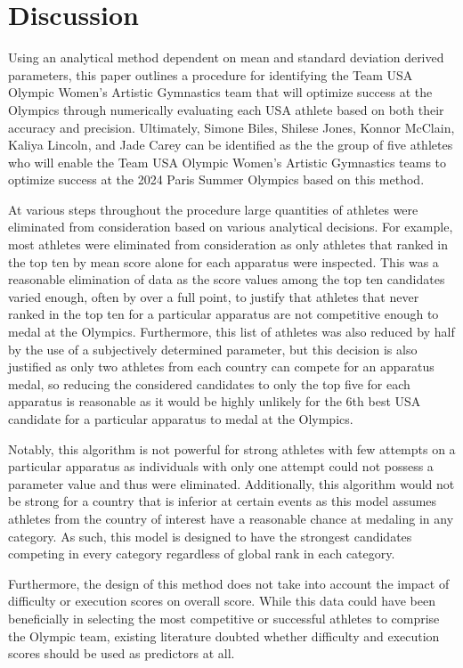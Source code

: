 \documentclass[12pt]{article}
\begin{document}
\section{Discussion}
\label{sec:dis}

Using an analytical method dependent on mean and standard deviation derived parameters, this paper 
outlines a procedure for identifying the Team USA Olympic Women’s Artistic Gymnastics team that will optimize 
success at the Olympics through numerically evaluating each USA athlete based on both their accuracy and precision. 
Ultimately, Simone Biles, Shilese Jones, Konnor McClain, Kaliya Lincoln, and Jade Carey can be identified as the 
the group of five athletes who will enable the Team USA Olympic Women’s Artistic Gymnastics teams to optimize 
success at the 2024 Paris Summer Olympics based on this method.

At various steps throughout the procedure large quantities of athletes were eliminated from consideration 
based on various analytical decisions. For example, most athletes were eliminated from consideration as 
only athletes that ranked in the top ten by mean score alone for each apparatus were inspected. This was a 
reasonable elimination of data as the score values among the top ten candidates varied enough, often by over a 
full point, to justify that athletes that never ranked in the top ten for a particular apparatus are not 
competitive enough to medal at the Olympics. Furthermore, this list of athletes was also reduced by half by the 
use of a subjectively determined parameter, but this decision is also justified as only two athletes from each 
country can compete for an apparatus medal, so reducing the considered candidates to only the top five for each 
apparatus is reasonable as it would be highly unlikely for the 6th best USA candidate for a particular apparatus 
to medal at the Olympics.

Notably, this algorithm is not powerful for strong athletes with few attempts on a particular apparatus as individuals 
with only one attempt could not possess a parameter value and thus were eliminated. Additionally, this algorithm 
would not be strong for a country that is inferior at certain events as this model assumes athletes from the country 
of interest have a reasonable chance at medaling in any category. As such, this model is designed to have the strongest 
candidates competing in every category regardless of global rank in each category.

Furthermore, the design of this method does not take into account the impact of difficulty or execution scores on 
overall score. While this data could have been beneficially in selecting the most competitive or successful athletes 
to comprise the Olympic team, existing literature doubted whether difficulty and execution scores should be 
used as predictors at all.
\end{document}
